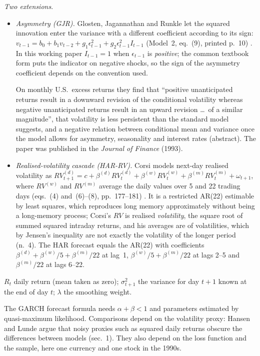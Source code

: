 \begin{qfmodel}
\emph{Two extensions}.
\begin{itemize}
\item \emph{Asymmetry (GJR).} Glosten, Jagannathan and Runkle let the squared innovation enter the variance with a different coefficient according to its sign: $v_{t-1}=b_0+b_1v_{t-2}+g_1\epsilon^2_{t-1}+g_2\epsilon^2_{t-1}I_{t-1}$ (Model~2, eq.~(9), printed p.~10) \citep[Minneapolis Fed Working Paper~505, November 1992, printed p.~10]{wide-gjr-garch}. In this working paper $I_{t-1}=1$ when $\epsilon_{t-1}$ is \emph{positive}; the common textbook form puts the indicator on negative shocks, so the sign of the asymmetry coefficient depends on the convention used.

On monthly U.S.\ excess returns they find that ``positive unanticipated returns result in a downward revision of the conditional volatility whereas negative unanticipated returns result in an upward revision \dots\ of a similar magnitude'', that volatility is less persistent than the standard model suggests, and a negative relation between conditional mean and variance once the model allows for asymmetry, seasonality and interest rates (abstract). The paper was published in the \emph{Journal of Finance} (1993).
\item \emph{Realised-volatility cascade (HAR-RV).} Corsi models next-day realised volatility as $RV^{(d)}_{t+1}=c+\beta^{(d)}RV^{(d)}_t+\beta^{(w)}RV^{(w)}_t+\beta^{(m)}RV^{(m)}_t+\omega_{t+1}$, where $RV^{(w)}$ and $RV^{(m)}$ average the daily values over 5 and 22 trading days (eqs.~(4) and~(6)--(8), pp.~177--181) \citep[\emph{Journal of Financial Econometrics} 7(2), 2009, pp.~174--196]{wide-corsi-har}. It is a restricted AR(22) estimable by least squares, which reproduces long memory approximately without being a long-memory process; Corsi's $RV$ is realised \emph{volatility}, the square root of summed squared intraday returns, and his averages are of volatilities, which by Jensen's inequality are not exactly the volatility of the longer period (n.~4). The HAR forecast equals the AR(22) with coefficients $\beta^{(d)}+\beta^{(w)}/5+\beta^{(m)}/22$ at lag~1, $\beta^{(w)}/5+\beta^{(m)}/22$ at lags 2--5 and $\beta^{(m)}/22$ at lags 6--22.
\end{itemize}

 $R_t$ daily return (mean taken as zero); $\sigma^2_{t+1}$ the variance for day $t+1$ known at the end of day $t$; $\lambda$ the smoothing weight.

 The GARCH forecast formula needs $\alpha+\beta<1$ and parameters estimated by quasi-maximum likelihood. Comparisons depend on the volatility proxy: Hansen and Lunde argue that noisy proxies such as squared daily returns obscure the differences between models (sec.~1). They also depend on the loss function and the sample, here one currency and one stock in the 1990s.


\end{qfmodel}

